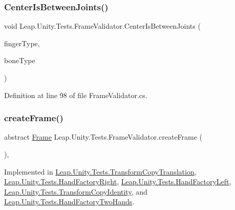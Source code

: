\subsubsection{\texorpdfstring{CenterIsBetweenJoints()}{CenterIsBetweenJoints()}}
{\footnotesize\ttfamily void Leap.\+Unity.\+Tests.\+Frame\+Validator.\+Center\+Is\+Between\+Joints (\begin{DoxyParamCaption}\item[{\mbox{[}\+Value\+Source(typeof(\+Frame\+Validator), \char`\"{}\+\_\+fingers\char`\"{})\mbox{]} \mbox{\hyperlink{class_leap_1_1_finger_ae75e8d46a01aff0bd5c6d6fb99e2f2ba}{Finger.\+Finger\+Type}}}]{finger\+Type,  }\item[{\mbox{[}\+Value\+Source(typeof(\+Frame\+Validator), \char`\"{}\+\_\+bones\char`\"{})\mbox{]} \mbox{\hyperlink{class_leap_1_1_bone_a21054e31cefa7b75f25a026006fdbb1b}{Bone.\+Bone\+Type}}}]{bone\+Type }\end{DoxyParamCaption})}



Definition at line 98 of file Frame\+Validator.\+cs.

\mbox{\label{class_leap_1_1_unity_1_1_tests_1_1_frame_validator_ae397067480c6fd2183160f048094e466}} 
\subsubsection{\texorpdfstring{createFrame()}{createFrame()}}
{\footnotesize\ttfamily abstract \mbox{\hyperlink{class_leap_1_1_frame}{Frame}} Leap.\+Unity.\+Tests.\+Frame\+Validator.\+create\+Frame (\begin{DoxyParamCaption}{ }\end{DoxyParamCaption})\hspace{0.3cm}{\ttfamily [protected]}, {}}



Implemented in \mbox{\hyperlink{class_leap_1_1_unity_1_1_tests_1_1_transform_copy_translation_abaa9e440cd40e50c4d4e46ab6eb3fbc4}{Leap.\+Unity.\+Tests.\+Transform\+Copy\+Translation}}, \mbox{\hyperlink{class_leap_1_1_unity_1_1_tests_1_1_hand_factory_right_a78c8a9a73c6c7e18c0eb8890e39d64b5}{Leap.\+Unity.\+Tests.\+Hand\+Factory\+Right}}, \mbox{\hyperlink{class_leap_1_1_unity_1_1_tests_1_1_hand_factory_left_aee2926151ba99102d58cbefb2a029b06}{Leap.\+Unity.\+Tests.\+Hand\+Factory\+Left}}, \mbox{\hyperlink{class_leap_1_1_unity_1_1_tests_1_1_transform_copy_identity_aaad557351863e9bcb612237c4a47821f}{Leap.\+Unity.\+Tests.\+Transform\+Copy\+Identity}}, and \mbox{\hyperlink{class_leap_1_1_unity_1_1_tests_1_1_hand_factory_two_hands_ab929744527e15f0ad07ff17d0e867355}{Leap.\+Unity.\+Tests.\+Hand\+Factory\+Two\+Hands}}.

